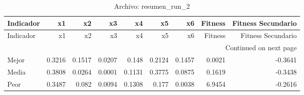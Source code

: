 \begin{longtable}{lrrrrrrrr}
\caption{Archivo: resumen\_run\_2}\label{tab:resumen_run_2} \\
\toprule
Indicador & x1 & x2 & x3 & x4 & x5 & x6 & Fitness & Fitness Secundario \\
\midrule
\endfirsthead
\toprule
Indicador & x1 & x2 & x3 & x4 & x5 & x6 & Fitness & Fitness Secundario \\
\midrule
\endhead
\midrule
\multicolumn{9}{r}{Continued on next page} \\
\midrule
\endfoot
\bottomrule
\endlastfoot
Mejor & 0.3216 & 0.1517 & 0.0207 & 0.148 & 0.2124 & 0.1457 & 0.0021 & -0.3641 \\
Media & 0.3808 & 0.0264 & 0.0001 & 0.1131 & 0.3775 & 0.0875 & 0.1619 & -0.3438 \\
Peor & 0.3487 & 0.082 & 0.0094 & 0.1308 & 0.177 & 0.0038 & 6.9454 & -0.2616 \\
\end{longtable}